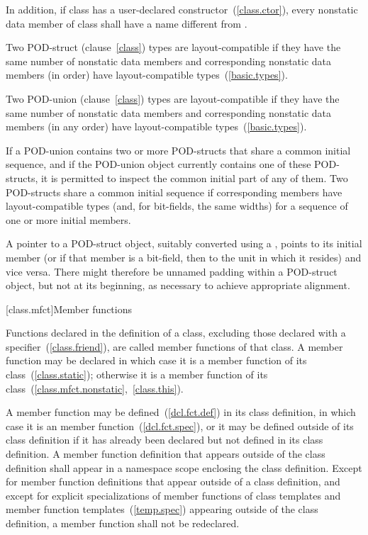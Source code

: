 \pnumalt
In addition, if class  has a user-declared
constructor~(\ref{class.ctor}), every nonstatic data member of class
 shall have a name different from .

\pnum
Two POD-struct (clause~\ref{class}) types are layout-compatible if they
have the same number of nonstatic data members and corresponding
nonstatic data members (in order) have layout-compatible
types~(\ref{basic.types}).

\pnum
Two POD-union (clause~\ref{class}) types are layout-compatible if they
have the same number of nonstatic data members and corresponding
nonstatic data members (in any order) have layout-compatible
types~(\ref{basic.types}).

\pnum
If a POD-union contains two or more POD-structs that share a common
initial sequence, and if the POD-union object currently contains one of
these POD-structs, it is permitted to inspect the common initial part of
any of them. Two POD-structs share a common initial sequence if
corresponding members have layout-compatible types (and, for bit-fields,
the same widths) for a sequence of one or more initial members.

\pnum
A pointer to a POD-struct object, suitably converted using a
, points to its initial member (or if that
member is a bit-field, then to the unit in which it resides) and vice
versa.
\enternote
There might therefore be unnamed padding within a POD-struct object, but
not at its beginning, as necessary to achieve appropriate alignment.
\exitnote

[class.mfct]{Member functions}%

\pnum
Functions declared in the definition of a class, excluding those
declared with a  specifier~(\ref{class.friend}), are
called member functions of that class. A member function may be declared
 in which case it is a  member function
of its class~(\ref{class.static}); otherwise it is a
 member function of its
class~(\ref{class.mfct.nonstatic},~\ref{class.this}).

\pnum
{}%
%
A member function may be defined~(\ref{dcl.fct.def}) in its class
definition, in which case it is an  member
function~(\ref{dcl.fct.spec}), or it may be defined outside of its class
definition if it has already been declared but not defined in its class
definition. A member function definition that appears outside of the
class definition shall appear in a namespace scope enclosing the class
definition. Except for member function definitions that appear outside
of a class definition, and except for explicit specializations of member
functions of class templates and member function
templates~(\ref{temp.spec}) appearing outside of the class definition, a
member function shall not be redeclared.

